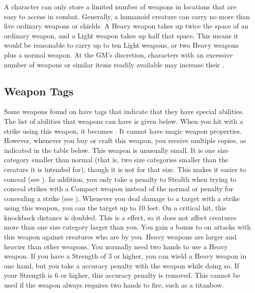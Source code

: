         A character can only store a limited number of weapons in locations that are easy to access in combat.
        Generally, a humanoid creature can carry no more than five ordinary weapons or shields.
        A Heavy weapon takes up twice the space of an ordinary weapon, and a Light weapon takes up half that space.
        This means it would be reasonable to carry up to ten Light weapons, or two Heavy weapons plus a normal weapon.
        At the GM's discretion, characters with an excessive number of weapons or similar items readily available may increase their .

    \subsection{Weapon Tags}\label{Weapon Tags}
        Some weapons found on  have tags that indicate that they have special abilities. The list of abilities that weapons can have is given below.
         When you hit with a strike using this weapon, it becomes .
        It cannot have magic weapon properties.
        However, whenever you buy or craft this weapon, you receive multiple copies, as indicated in the table below.
         This weapon is unusually small.
        It is one size category smaller than normal (that is, two size categories smaller than the creature it is intended for), though it is not  for that size.
        This makes it easier to conceal (see ).
        In addition, you only take a  penalty to Stealth when trying to conceal strikes with a Compact weapon instead of the normal  or  penalty for concealing a strike (see ).
         Whenever you deal damage to a target with a strike using this weapon, you can  the target up to 10 feet.
        On a critical hit, this knockback distance is doubled.
        This is a  effect, so it does not affect creatures more than one size category larger than you.
         You gain a  bonus to  on  attacks with this weapon against creatures who are \grappled by you.
         Heavy weapons are larger and heavier than other weapons.
        You normally need two hands to use a Heavy weapon.
        If you have a Strength of 3 or higher, you can wield a Heavy weapon in one hand, but you take a  accuracy penalty with the weapon while doing so.
        If your Strength is 6 or higher, this accuracy penalty is removed.
        This cannot be used if the weapon always requires two hands to fire, such as a titanbow.

